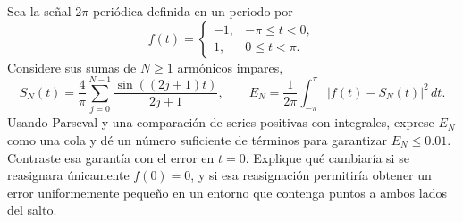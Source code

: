 Sea la señal \(2\pi\)-periódica definida en un periodo por
\[
f(t)=
\begin{cases}
-1,&-\pi\le t<0,\\
1,&0\le t<\pi.
\end{cases}
\]
Considere sus sumas de \(N\ge1\) armónicos impares,
\[
S_N(t)=\frac4\pi\sum_{j=0}^{N-1}
\frac{\sin((2j+1)t)}{2j+1},
\qquad
E_N=\frac1{2\pi}\int_{-\pi}^{\pi}|f(t)-S_N(t)|^2\,dt.
\]
Usando Parseval y una comparación de series positivas con integrales, exprese \(E_N\) como una cola y dé un número suficiente de términos para garantizar \(E_N\le0.01\). Contraste esa garantía con el error en \(t=0\). Explique qué cambiaría si se reasignara únicamente \(f(0)=0\), y si esa reasignación permitiría obtener un error uniformemente pequeño en un entorno que contenga puntos a ambos lados del salto.
